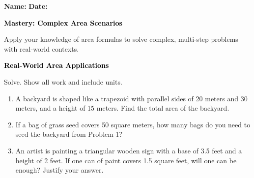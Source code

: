 \documentclass[12pt, letterpaper, fleqn]{article}
\begin{document}
\textbf{Name:} \underline{\hspace{5cm}}
\hfill
\textbf{Date:} \underline{\hspace{3cm}}\\

\begin{tcolorbox}[colback=black!10]
    \large\textcolor{black}{\textbf{Mastery: Complex Area Scenarios}}
\end{tcolorbox}

\vspace{3mm}

\noindent
Apply your knowledge of area formulas to solve complex, multi-step problems with real-world contexts.

\vspace{4mm}

\begin{tcolorbox}[colback=black!10]
\large\textcolor{black}{\textbf{Real-World Area Applications}}
\end{tcolorbox}

\noindent
Solve. Show all work and include units.

\vspace{3mm}

\begin{enumerate}[itemsep=1.5cm, leftmargin=0.6cm]

\item A backyard is shaped like a trapezoid with parallel sides of 20 meters and 30 meters, and a height of 15 meters. Find the total area of the backyard.

\vspace{2cm}

\item If a bag of grass seed covers 50 square meters, how many bags do you need to seed the backyard from Problem 1?

\vspace{2cm}

\item An artist is painting a triangular wooden sign with a base of 3.5 feet and a height of 2 feet. If one can of paint covers 1.5 square feet, will one can be enough? Justify your answer.

\vspace{2cm}

\end{enumerate}
\end{document}
